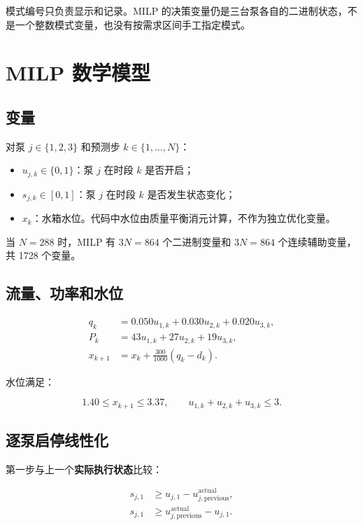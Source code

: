 \documentclass[UTF8,a4paper,11pt]{ctexart}
\begin{document}
模式编号只负责显示和记录。MILP 的决策变量仍是三台泵各自的二进制状态，不是一个整数模式变量，也没有按需求区间手工指定模式。

\section{MILP 数学模型}

\subsection{变量}

对泵 $j\in\{1,2,3\}$ 和预测步 $k\in\{1,\dots,N\}$：

\begin{itemize}
  \item $u_{j,k}\in\{0,1\}$：泵 $j$ 在时段 $k$ 是否开启；
  \item $s_{j,k}\in[0,1]$：泵 $j$ 在时段 $k$ 是否发生状态变化；
  \item $x_k$：水箱水位。代码中水位由质量平衡消元计算，不作为独立优化变量。
\end{itemize}

当 $N=288$ 时，MILP 有 $3N=864$ 个二进制变量和 $3N=864$ 个连续辅助变量，共 1728 个变量。

\subsection{流量、功率和水位}

\begin{align}
q_k &= 0.050u_{1,k}+0.030u_{2,k}+0.020u_{3,k},\\
P_k &= 43u_{1,k}+27u_{2,k}+19u_{3,k},\\
x_{k+1} &= x_k+\frac{300}{1000}(q_k-d_k).
\end{align}

水位满足：

\begin{equation}
1.40\le x_{k+1}\le3.37,
\qquad
u_{1,k}+u_{2,k}+u_{3,k}\le3.
\end{equation}

\subsection{逐泵启停线性化}

第一步与上一个\textbf{实际执行状态}比较：

\begin{align}
s_{j,1}&\ge u_{j,1}-u^{\mathrm{actual}}_{j,\mathrm{previous}},\\
s_{j,1}&\ge u^{\mathrm{actual}}_{j,\mathrm{previous}}-u_{j,1}.
\end{align}
\end{document}

